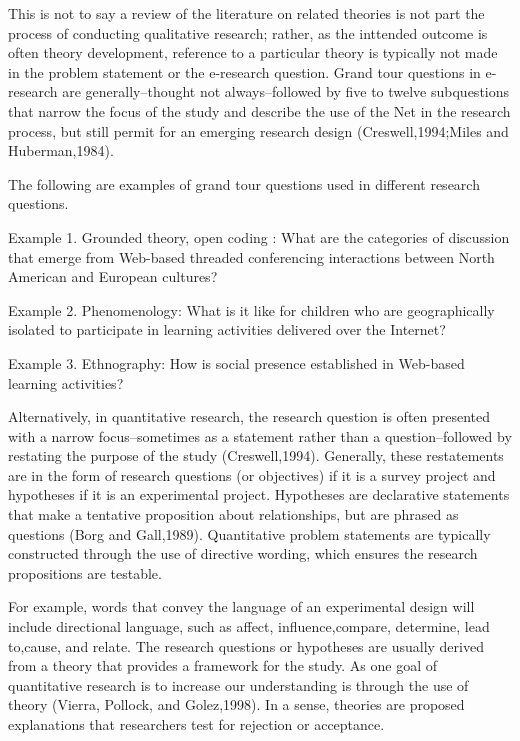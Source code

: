 \documentclass[12pt]{beamer}
\begin{document}
\begin{frame}
 This is not to say a review of the literature on related theories is not part the process of conducting qualitative research; rather, as the inttended outcome is often theory development, reference to a particular theory is typically not made in the problem statement or the e-research question.
  Grand tour questions in e-research are generally--thought not always--followed by five to twelve subquestions that narrow the focus of the study and describe the use of the Net in the research process, but still permit for an emerging research design (Creswell,1994;Miles and Huberman,1984).
\end{frame}
\begin{frame}
The following are examples of grand tour questions used in different research questions.

Example 1. Grounded theory, open coding : What are the categories of discussion that emerge from Web-based threaded conferencing interactions between North American and European cultures?

Example 2. Phenomenology: What is it like for children who are geographically isolated to participate in learning activities delivered over the Internet?

Example 3. Ethnography: How is social presence established in Web-based learning activities?
 \end{frame}
 \begin{frame}
Alternatively, in quantitative research, the research question is often presented with a narrow focus--sometimes as a statement rather than a question--followed by restating the purpose of the study (Creswell,1994). Generally, these restatements are in the form of research questions (or objectives) if it is a survey project and hypotheses if it is an experimental project. Hypotheses are declarative statements that make a tentative proposition about relationships, but are phrased as questions (Borg and Gall,1989). Quantitative problem statements are typically constructed through the use of directive wording, which ensures the research propositions are testable.
\end{frame}
\begin{frame}
 For example, words that convey the language of an experimental design will include directional language, such as affect, influence,compare, determine, lead to,cause, and relate. The research questions or hypotheses are usually derived from a theory that provides a framework for the study.
 As one goal of quantitative research is to increase our understanding is through the use of theory (Vierra, Pollock, and Golez,1998). In a sense, theories are proposed explanations that researchers test for rejection or acceptance.
\end{frame}
\end{document}
